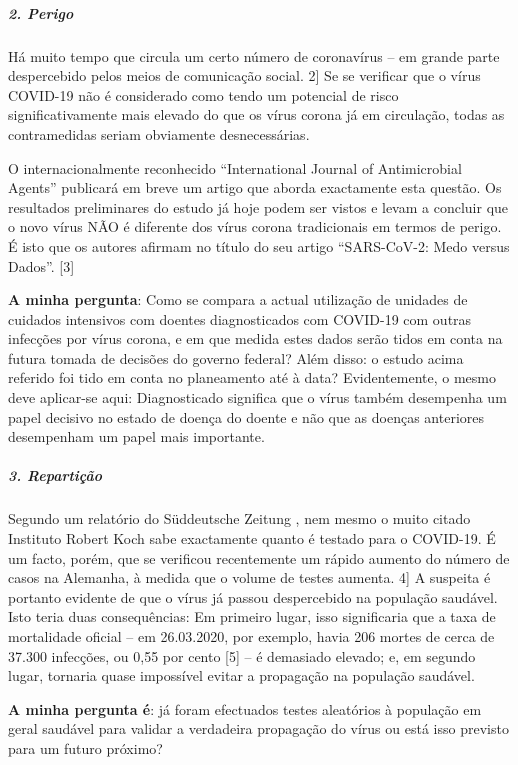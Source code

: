 \hypertarget{2-perigo}{%
\subparagraph{\texorpdfstring{\textbf{2.
Perigo}}{2. Perigo}}\label{2-perigo}}

Há muito tempo que circula um certo número de coronavírus -- em grande
parte despercebido pelos meios de comunicação social. 2{]} Se se
verificar que o vírus COVID-19 não é considerado como tendo um potencial
de risco significativamente mais elevado do que os vírus corona já em
circulação, todas as contramedidas seriam obviamente desnecessárias.

O internacionalmente reconhecido ``International Journal of
Antimicrobial Agents'' publicará em breve um artigo que aborda
exactamente esta questão. Os resultados preliminares do estudo já hoje
podem ser vistos e levam a concluir que o novo vírus NÃO é diferente dos
vírus corona tradicionais em termos de perigo. É isto que os autores
afirmam no título do seu artigo ``SARS-CoV-2: Medo versus Dados''.
{[}3{]}

\textbf{A minha pergunta}: Como se compara a actual utilização de
unidades de cuidados intensivos com doentes diagnosticados com COVID-19
com outras infecções por vírus corona, e em que medida estes dados serão
tidos em conta na futura tomada de decisões do governo federal? Além
disso: o estudo acima referido foi tido em conta no planeamento até à
data? Evidentemente, o mesmo deve aplicar-se aqui: Diagnosticado
significa que o vírus também desempenha um papel decisivo no estado de
doença do doente e não que as doenças anteriores desempenham um papel
mais importante.

\hypertarget{3-repartiuxe7uxe3o}{%
\subparagraph{\texorpdfstring{\textbf{3.
Repartição}}{3. Repartição}}\label{3-repartiuxe7uxe3o}}

Segundo um relatório do Süddeutsche Zeitung , nem mesmo o muito citado
Instituto Robert Koch sabe exactamente quanto é testado para o COVID-19.
É um facto, porém, que se verificou recentemente um rápido aumento do
número de casos na Alemanha, à medida que o volume de testes aumenta.
4{]} A suspeita é portanto evidente de que o vírus já passou
despercebido na população saudável. Isto teria duas consequências: Em
primeiro lugar, isso significaria que a taxa de mortalidade oficial --
em 26.03.2020, por exemplo, havia 206 mortes de cerca de 37.300
infecções, ou 0,55 por cento {[}5{]} -- é demasiado elevado; e, em
segundo lugar, tornaria quase impossível evitar a propagação na
população saudável.

\textbf{A minha pergunta é}: já foram efectuados testes aleatórios à
população em geral saudável para validar a verdadeira propagação do
vírus ou está isso previsto para um futuro próximo?

